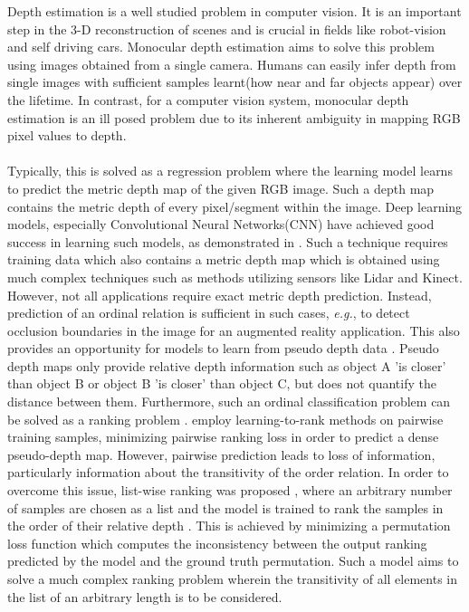 Depth estimation is a well studied problem in computer vision. It is an important step in the 3-D reconstruction of scenes and is crucial in fields like robot-vision and self driving cars. Monocular depth estimation aims to solve this problem using images obtained from a single camera.
Humans can easily infer depth from single images with sufficient samples learnt(how near and far objects appear) over the lifetime. In contrast, for a computer vision system, monocular depth estimation is an ill posed problem due to its inherent ambiguity in mapping RGB pixel values to depth.
\\\\
Typically, this is solved as a regression problem where the learning model learns to predict the metric depth map of the given RGB image. Such a depth map contains the metric depth of every pixel/segment within the image. Deep learning models, especially Convolutional Neural Networks(CNN) have achieved good success in learning such models, as demonstrated in \cite{eigen2014depth}. Such a technique requires training data which also contains a metric depth map which is obtained using much complex techniques such as methods utilizing sensors like Lidar and Kinect.\\
However, not all applications require exact metric depth prediction. Instead, prediction of an ordinal relation is sufficient in such cases, \textit{e.g.}, to detect occlusion boundaries in the image for an augmented reality application.  This also provides an opportunity for models to learn from pseudo depth data \cite{zoran2015learning,chen2016single}. Pseudo depth maps only provide relative depth information such as object A 'is closer' than object B or object B 'is closer' than object C, but does not quantify the distance between them. Furthermore, such an ordinal classification problem can be solved as a ranking problem \cite{liu2011learning}. \cite{xian2018monocular,xian2020structure} employ learning-to-rank methods on pairwise training samples, minimizing pairwise ranking loss in order to predict a dense pseudo-depth map. However, pairwise prediction leads to loss of information, particularly information about the transitivity of the order relation\cite{Lienen_2021_CVPR}. In order to overcome this issue, list-wise ranking was proposed \cite{cao2007learning}, where an arbitrary number of samples are chosen as a list and the model is trained to rank the samples in the order of their relative depth \cite{Lienen_2021_CVPR}. This is achieved by minimizing a permutation loss function which computes the inconsistency between the output ranking predicted by the model and the ground truth permutation. Such a model aims to solve a much complex ranking problem wherein the transitivity of all elements in the list of an arbitrary length is to be considered.

